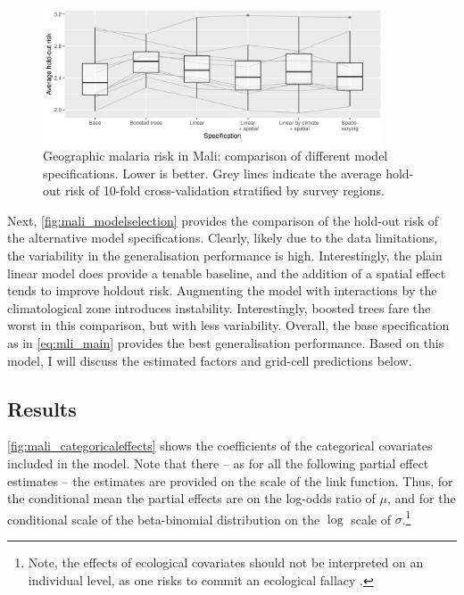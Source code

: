 \begin{figure}[!t]
	\centering
	\includegraphics[width=0.9\textwidth, keepaspectratio]{figures/mali_modelselection.png}
	\caption{Geographic malaria risk in Mali: comparison of different model specifications. Lower is better. Grey lines indicate the average hold-out risk of 10-fold cross-validation stratified by survey regions.}
	\label{fig:mali_modelselection}
\end{figure}

Next, \autoref{fig:mali_modelselection} provides the comparison of the hold-out risk of the alternative model specifications. Clearly, likely due to the data limitations, the variability in the generalisation performance is high. Interestingly, the plain linear model does provide a tenable baseline, and the addition of a spatial effect tends to improve holdout risk. Augmenting the model with interactions by the climatological zone introduces instability. Interestingly, boosted trees fare the worst in this comparison, but with less variability. Overall, the base specification as in \autoref{eq:mli_main} provides the best generalisation performance. Based on this model, I will discuss the estimated factors and grid-cell predictions below.


\subsection{Results}

\autoref{fig:mali_categoricaleffects} shows the coefficients of the categorical covariates included in the model. Note that there -- as for all the following partial effect estimates -- the estimates are provided on the scale of the link function. Thus, for the conditional mean the partial effects are on the log-odds ratio of $\mu$, and for the conditional scale of the beta-binomial distribution on the $\log$ scale of $\sigma$.\footnote{Note, the effects of ecological covariates should not be interpreted on an individual level, as one risks to commit an ecological fallacy \autocite{piantadosiEcologicalFallacy1988}.}

